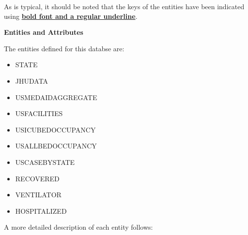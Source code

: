\documentclass[11pt]{article}
\begin{document}
\noindent
As is typical, it should be noted that the keys of the entities have been indicated using \textbf{\underline{bold font and a regular underline}}.

\pagebreak

\noindent
\textbf{Entities and Attributes}

\noindent
The entities defined for this databse are: \\

\begin{itemize}
    \item STATE
    \item JHUDATA
    \item USMEDAIDAGGREGATE
    \item USFACILITIES
    \item USICUBEDOCCUPANCY
    \item USALLBEDOCCUPANCY
    \item USCASEBYSTATE
    \item RECOVERED
    \item VENTILATOR
    \item HOSPITALIZED
\end{itemize}

\noindent
A more detailed description of each entity follows:
\end{document}
